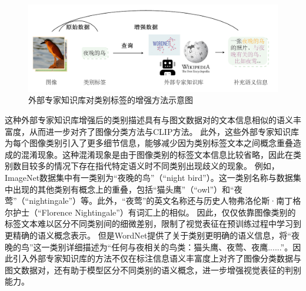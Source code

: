 \label{sec:iclip-adapt-external}
\begin{figure}
  \centering
  \includegraphics[width=1.0\linewidth]{figures/iclip-knowledge.pdf}
  \caption{外部专家知识库对类别标签的增强方法示意图}
  \label{fig:iclip-knowledge}
\end{figure}


 这种外部专家知识库增强后的类别描述具有与图文数据对的文本信息相似的语义丰富度，从而进一步对齐了图像分类方法与CLIP方法。
 此外，这些外部专家知识库为每个图像类别引入了更多细节信息，能够减少因为类别标签文本之间概念重叠造成的混淆现象。这种混淆现象是由于图像类别的标签文本信息比较省略，因此在类别数目较多的情况下存在指代特定语义时不同类别出现歧义的现象。
 例如，ImageNet数据集中有一类别为“夜晚的鸟”（“night bird”）。这一类别名称与数据集中出现的其他类别有概念上的重叠，包括“猫头鹰”（“owl”）和“夜莺”（“nightingale”）等。此外，“夜莺”的英文名称还与历史人物弗洛伦斯·南丁格尔护士（“Florence Nightingale”）有词汇上的相似。
 因此，仅仅依靠图像类别的标签文本难以区分不同类别间的细微差别，限制了视觉表征在预训练过程中学习到更精确的语义概念表示。
 但是WordNet提供了关于类别更明确的语义信息，将“夜晚的鸟”这一类别详细描述为“任何与夜相关的鸟类：猫头鹰、夜莺、夜鹰......”。因此引入外部专家知识库的方法不仅在标注信息语义丰富度上对齐了图像分类数据与图文数据对，还有助于模型区分不同类别的语义概念，进一步增强视觉表征的判别能力。


